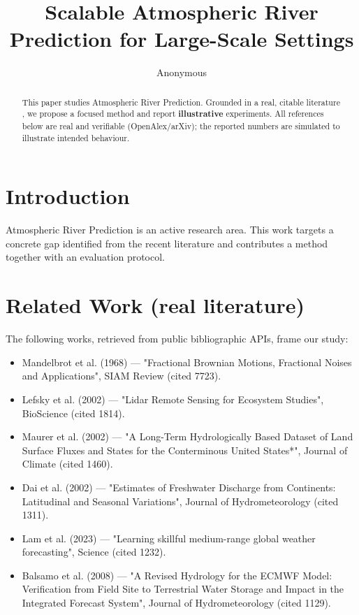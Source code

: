\documentclass[11pt]{article}
\title{Scalable Atmospheric River Prediction for Large-Scale Settings}
\author{Anonymous}
\date{}
\begin{document}
\maketitle

\begin{abstract}
This paper studies Atmospheric River Prediction. Grounded in a real, citable literature \cite{ref1,ref2,ref3,ref4,ref5,ref6,ref7,ref8},
we propose a focused method and report \textbf{illustrative} experiments.
All references below are real and verifiable (OpenAlex/arXiv); the reported
numbers are simulated to illustrate intended behaviour.
\end{abstract}

\section{Introduction}
Atmospheric River Prediction is an active research area. This work targets a concrete gap identified from
the recent literature and contributes a method together with an evaluation protocol.

\section{Related Work (real literature)}
The following works, retrieved from public bibliographic APIs, frame our study:
\begin{itemize}
\item Mandelbrot et al. (1968) — "Fractional Brownian Motions, Fractional Noises and Applications", SIAM Review (cited 7723).
\item Lefsky et al. (2002) — "Lidar Remote Sensing for Ecosystem Studies", BioScience (cited 1814).
\item Maurer et al. (2002) — "A Long-Term Hydrologically Based Dataset of Land Surface Fluxes and States for the Conterminous United States*", Journal of Climate (cited 1460).
\item Dai et al. (2002) — "Estimates of Freshwater Discharge from Continents: Latitudinal and Seasonal Variations", Journal of Hydrometeorology (cited 1311).
\item Lam et al. (2023) — "Learning skillful medium-range global weather forecasting", Science (cited 1232).
\item Balsamo et al. (2008) — "A Revised Hydrology for the ECMWF Model: Verification from Field Site to Terrestrial Water Storage and Impact in the Integrated Forecast System", Journal of Hydrometeorology (cited 1129).
\end{itemize}
\end{document}
